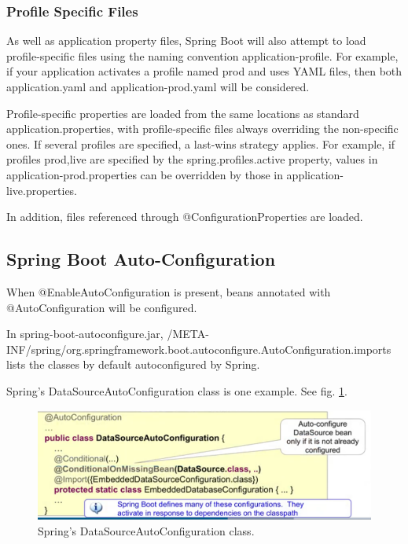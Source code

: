 \documentclass{scrartcl}
\begin{document}
\subsubsection{Profile Specific Files}

As well as application property files, Spring Boot will also attempt to load profile-specific files using the naming convention application-{profile}. For example, if your application activates a profile named prod and uses YAML files, then both application.yaml and application-prod.yaml will be considered.

Profile-specific properties are loaded from the same locations as standard application.properties, with profile-specific files always overriding the non-specific ones. If several profiles are specified, a last-wins strategy applies. For example, if profiles prod,live are specified by the spring.profiles.active property, values in application-prod.properties can be overridden by those in application-live.properties.

In addition, files referenced through @ConfigurationProperties are loaded.


\subsection{Spring Boot Auto-Configuration}

When @EnableAutoConfiguration is present, beans annotated with @AutoConfiguration  will be configured.

In spring-boot-autoconfigure.jar, /META-INF/spring/org.springframework.boot.autoconfigure.AutoConfiguration.imports lists the classes by default autoconfigured by Spring.

Spring's DataSourceAutoConfiguration class is one example. See fig. \ref{fig:datasourceautoconfiguration}.

\begin{figure}
    \centering
    \includegraphics[width=1\linewidth]{datasourceautoconfiguration}
    \caption{Spring's DataSourceAutoConfiguration class.}
    \label{fig:datasourceautoconfiguration}
\end{figure}
\end{document}

